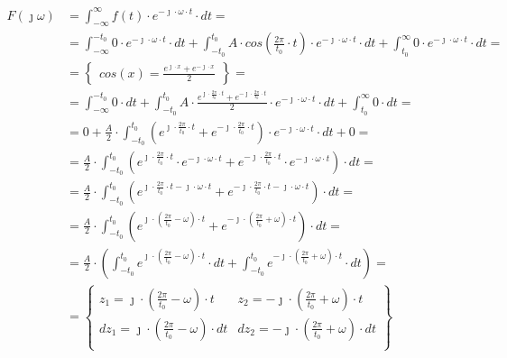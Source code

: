 \begin{task}
\begin{align*}
F(\jmath \omega )&=\int_{-\infty }^{\infty}f(t) \cdot e^{-\jmath \cdot \omega \cdot t}\cdot dt=\\
&=\int_{-\infty }^{-t_0} 0 \cdot e^{-\jmath \cdot \omega \cdot t} \cdot dt + \int_{-t_0 }^{t_0} A \cdot cos\left(\frac{2\pi}{t_0}\cdot t\right) \cdot e^{-\jmath \cdot \omega \cdot t} \cdot dt + \int_{t_0 }^{\infty} 0 \cdot e^{-\jmath \cdot \omega \cdot t} \cdot dt =\\
&=\begin{Bmatrix}
cos(x) = \frac{e^{\jmath \cdot x}+e^{-\jmath \cdot x}}{2}
\end{Bmatrix}=\\
&=\int_{-\infty }^{-t_0} 0 \cdot dt + \int_{-t_0 }^{t_0} A \cdot \frac{e^{\jmath \cdot \frac{2\pi}{t_0}\cdot t}+e^{-\jmath \cdot \frac{2\pi}{t_0}\cdot t}}{2} \cdot e^{-\jmath \cdot \omega \cdot t} \cdot dt + \int_{t_0 }^{\infty} 0 \cdot dt =\\
&=0 + \frac{A}{2} \cdot \int_{-t_0 }^{t_0} \left(e^{\jmath \cdot \frac{2\pi}{t_0}\cdot t}+e^{-\jmath \cdot \frac{2\pi}{t_0}\cdot t}\right) \cdot e^{-\jmath \cdot \omega \cdot t} \cdot dt + 0 =\\
&=\frac{A}{2} \cdot \int_{-t_0 }^{t_0} \left(e^{\jmath \cdot \frac{2\pi}{t_0}\cdot t}\cdot e^{-\jmath \cdot \omega \cdot t}+e^{-\jmath \cdot \frac{2\pi}{t_0}\cdot t}\cdot e^{-\jmath \cdot \omega \cdot t}\right) \cdot dt =\\
&=\frac{A}{2} \cdot \int_{-t_0 }^{t_0} \left(e^{\jmath \cdot \frac{2\pi}{t_0}\cdot t -\jmath \cdot \omega \cdot t}+e^{-\jmath \cdot \frac{2\pi}{t_0}\cdot t -\jmath \cdot \omega \cdot t}\right) \cdot dt =\\
&=\frac{A}{2} \cdot \int_{-t_0 }^{t_0} \left(e^{\jmath \cdot \left(\frac{2\pi}{t_0} - \omega \right) \cdot t}+e^{-\jmath \cdot \left(\frac{2\pi}{t_0} + \omega \right) \cdot t}\right) \cdot dt =\\
&=\frac{A}{2} \cdot \left( \int_{-t_0 }^{t_0} e^{\jmath \cdot \left(\frac{2\pi}{t_0} - \omega \right) \cdot t} \cdot dt + \int_{-t_0 }^{t_0} e^{-\jmath \cdot \left(\frac{2\pi}{t_0} + \omega \right) \cdot t} \cdot dt \right)=\\
&=\begin{Bmatrix}
z_1=\jmath \cdot \left(\frac{2\pi}{t_0} - \omega \right) \cdot t & z_2=-\jmath \cdot \left(\frac{2\pi}{t_0} + \omega \right) \cdot t\\
dz_1=\jmath \cdot \left(\frac{2\pi}{t_0} - \omega \right) \cdot dt & dz_2=-\jmath \cdot \left(\frac{2\pi}{t_0} + \omega \right) \cdot dt\\

\end{Bmatrix}
\end{align*}
\end{task}

